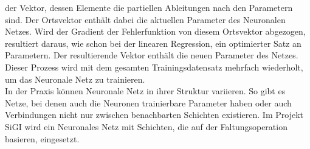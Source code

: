 der Vektor, dessen Elemente die partiellen Ableitungen nach den Parametern sind. Der Ortsvektor enthält dabei die aktuellen Parameter des Neuronalen Netzes. Wird der Gradient der Fehlerfunktion von diesem Ortsvektor abgezogen, resultiert daraus, wie schon bei der linearen Regression, ein optimierter Satz an Parametern. Der resultierende Vektor enthält die neuen Parameter des Netzes. Dieser Prozess wird mit dem gesamten Trainingsdatensatz mehrfach wiederholt, um das Neuronale Netz zu trainieren\cite{Goodfellow-et-al-2016-6}.\\ In der Praxis können Neuronale Netz in ihrer Struktur variieren. So gibt es Netze, bei denen auch die Neuronen trainierbare Parameter haben oder auch Verbindungen nicht nur zwischen benachbarten Schichten existieren. Im Projekt SiGI wird ein Neuronales Netz mit Schichten, die auf der Faltungsoperation basieren, eingesetzt\cite{Pang2019-2}.

